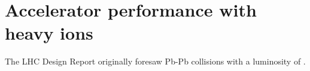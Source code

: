 \documentclass[../report.tex]{subfiles}
\begin{document}
\section{Accelerator performance with heavy ions}

The LHC Design Report originally foresaw Pb-Pb collisions with a 
luminosity of  .
 
\end{document}
